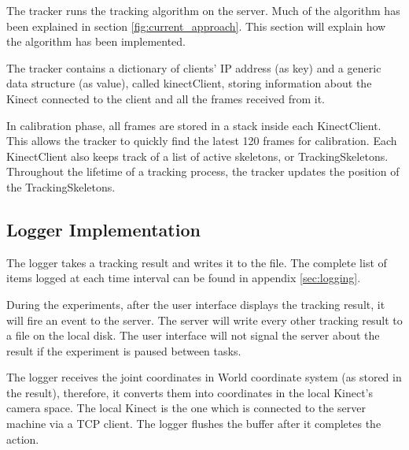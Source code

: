 The tracker runs the tracking algorithm on the server. Much of the algorithm has been explained in section \ref{fig:current_approach}. This section will explain how the algorithm has been implemented.

The tracker contains a dictionary of clients' IP address (as key) and a generic data structure (as value), called kinectClient, storing information about the Kinect connected to the client and all the frames received from it.

In calibration phase, all frames are stored in a stack inside each KinectClient. This allows the tracker to quickly find the latest 120 frames for calibration. Each KinectClient also keeps track of a list of active skeletons, or TrackingSkeletons. Throughout the lifetime of a tracking process, the tracker updates the position of the TrackingSkeletons.

\subsection{Logger Implementation}

The logger takes a tracking result and writes it to the file. The complete list of items logged at each time interval can be found in appendix \ref{sec:logging}.

During the experiments, after the user interface displays the tracking result, it will fire an event to the server. The server will write every other tracking result to a file on the local disk. The user interface will not signal the server about the result if the experiment is paused between tasks.

The logger receives the joint coordinates in World coordinate system (as stored in the result), therefore, it converts them into coordinates in the local Kinect's camera space. The local Kinect is the one which is connected to the server machine via a TCP client. The logger flushes the buffer after it completes the action.
